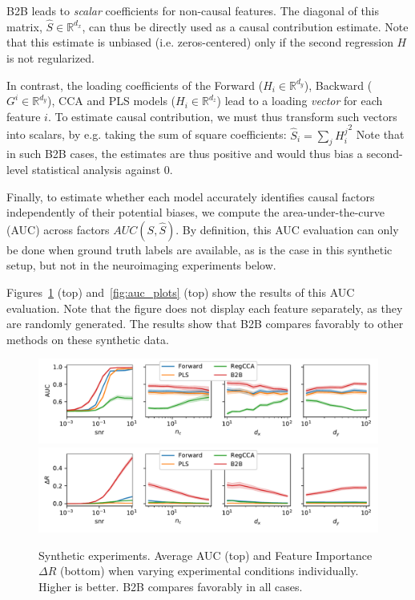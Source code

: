 %
B2B leads to \emph{scalar} coefficients for non-causal
features. The diagonal of this matrix, $\hat S \in \mathbb{R}^{d_x}$, can thus be directly used
as a causal contribution estimate. Note that this estimate is unbiased (i.e.
zeros-centered) only if the second regression $H$ is not regularized.

In contrast, the loading coefficients of the Forward ($H_i \in \mathbb{R}^{d_y}$),
Backward ($G^i \in \mathbb{R}^{d_y}$), CCA and PLS models ($H_i \in \mathbb{R}^{d_z}$) lead to a
loading \emph{vector} for each feature $i$.
To estimate causal contribution, we must thus transform such vectors into
scalars, by e.g. taking the sum of square coefficients:
  $\hat S_i = \sum_j {H^j_i}^2 $
Note that in such B2B cases, the estimates are thus positive and would thus bias
a second-level statistical analysis against 0.

Finally, to estimate whether each model accurately identifies causal factors independently of
their potential biases, we compute the
area-under-the-curve (AUC) across factors $AUC(S, \hat S)$.
By definition, this AUC evaluation can only be done when ground truth labels are available, as is the case in
this synthetic setup, but not in the neuroimaging experiments below.

Figures~\ref{fig:percondition} (top) and~\ref{fig:auc_plots} (top) show the
results of this AUC evaluation. Note that the figure does not display each
feature separately, as they are randomly generated. The results show that B2B
compares favorably to other methods on these synthetic data.


\begin{figure}[t]
  \centering
  \includegraphics[width=\linewidth]{figures/auc_condition.pdf}
  \includegraphics[width=\linewidth]{figures/r_in_condition.pdf}
  \vspace{-4ex}
  \caption{Synthetic experiments. Average AUC (top) and Feature Importance
  $\Delta R$ (bottom) when varying experimental conditions individually.
  Higher is better. B2B compares favorably in all cases.
  \label{fig:percondition}}
\end{figure}


